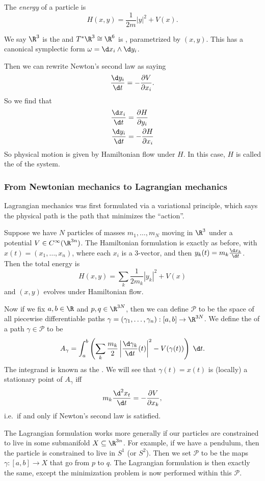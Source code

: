 \documentclass[a4paper]{article}
\begin{document}
\begin{defi}[Energy]
  The \emph{energy} of a particle is 
  \[
    H(x, y) = \frac{1}{2m} |y|^2 + V(x).
  \]
\end{defi}
We say $\R^3$ is the  and $T^* \R^3 \cong \R^6$ is , parametrized by $(x, y)$. This has a canonical symplectic form $\omega = \d x_i \wedge \d y_i$.

Then we can rewrite Newton's second law as saying
\[
  \frac{\d y_i}{\d t} = - \frac{\partial V}{\partial x_i}.
\]
So we find that
\begin{align*}
  \frac{\d x_i}{\d t} &= \frac{\partial H}{\partial y_i}\\
  \frac{\d y_i}{\d t} &= -\frac{\partial H}{\partial x_i}
\end{align*}
So physical motion is given by Hamiltonian flow under $H$. In this case, $H$ is called the  of the system.

\subsubsection*{From Newtonian mechanics to Lagrangian mechanics}
Lagrangian mechanics was first formulated via a variational principle, which says the physical path is the path that minimizes the ``action''.
\begin{eg}
  Suppose we have $N$ particles of masses $m_1, \ldots, m_N$ moving in $\R^3$ under a potential $V \in C^\infty(\R^{3n})$. The Hamiltonian formulation is exactly as before, with $x(t) = (x_1, \ldots, x_n)$, where each $x_i$ is a $3$-vector, and then $y_k(t) = m_k \frac{\d x_k}{\d t}$. Then the total energy is
  \[
    H(x, y) = \sum_k \frac{1}{2m_k} |y_k|^2 + V(x)
  \]
  and $(x, y)$ evolves under Hamiltonian flow.

  Now if we fix $a, b \in \R$ and $p, q \in \R^{3N}$, then we can define $\mathcal{P}$ to be the space of all piecewise differentiable paths $\gamma = (\gamma_1, \ldots, \gamma_n): [a, b] \to \R^{3N}$. We define the  of a path $\gamma \in \mathcal{P}$ to be
  \[
    A_\gamma = \int_a^b \left(\sum_k \frac{m_k}{2} \left|\frac{\d \gamma_k}{\d t}(t) \right|^2 - V(\gamma(t))\right)\;\d t.
  \]
  The integrand is known as the . We will see that $\gamma(t) = x(t)$ is (locally) a stationary point of $A_\gamma$ iff
  \[
    m_k \frac{\d^2 x_t}{\d t} = - \frac{\partial V}{\partial x_k},
  \]
  i.e.\ if and only if Newton's second law is satisfied.
\end{eg}
The Lagrangian formulation works more generally if our particles are constrained to live in some submanifold $X \subseteq \R^{3n}$. For example, if we have a pendulum, then the particle is constrained to live in $S^1$ (or $S^2$). Then we set $\mathcal{P}$ to be the maps $\gamma: [a, b] \to X$ that go from $p$ to $q$. The Lagrangian formulation is then exactly the same, except the minimization problem is now performed within this $\mathcal{P}$.
\end{document}
